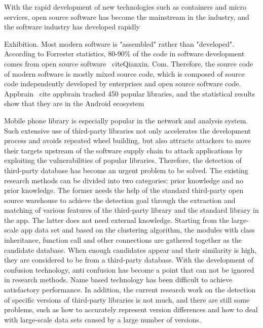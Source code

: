 
\begin{digest}
With the rapid development of new technologies such as containers and micro services, open source software has become the mainstream in the industry, and the software industry has developed rapidly

Exhibition. Most modern software is "assembled" rather than "developed". According to Forrester statistics, 80-90\% of the code in software development comes from open source software \ cite{Qianxin. Com}. Therefore, the source code of modern software is mostly mixed source code, which is composed of source code independently developed by enterprises and open source software code. Appbrain \ cite {appbrain} tracked 450 popular libraries, and the statistical results show that they are in the Android ecosystem

Mobile phone library is especially popular in the network and analysis system. Such extensive use of third-party libraries not only accelerates the development process and avoids repeated wheel building, but also attracts attackers to move their targets upstream of the software supply chain to attack applications by exploiting the vulnerabilities of popular libraries. Therefore, the detection of third-party database has become an urgent problem to be solved. The existing research methods can be divided into two categories: prior knowledge and no prior knowledge. The former needs the help of the standard third-party open source warehouse to achieve the detection goal through the extraction and matching of various features of the third-party library and the standard library in the app. The latter does not need external knowledge. Starting from the large-scale app data set and based on the clustering algorithm, the modules with class inheritance, function call and other connections are gathered together as the candidate database. When enough candidates appear and their similarity is high, they are considered to be from a third-party database. With the development of confusion technology, anti confusion has become a point that can not be ignored in research methods. Name based technology has been difficult to achieve satisfactory performance. In addition, the current research work on the detection of specific versions of third-party libraries is not much, and there are still some problems, such as how to accurately represent version differences and how to deal with large-scale data sets caused by a large number of versions.




\end{digest}
